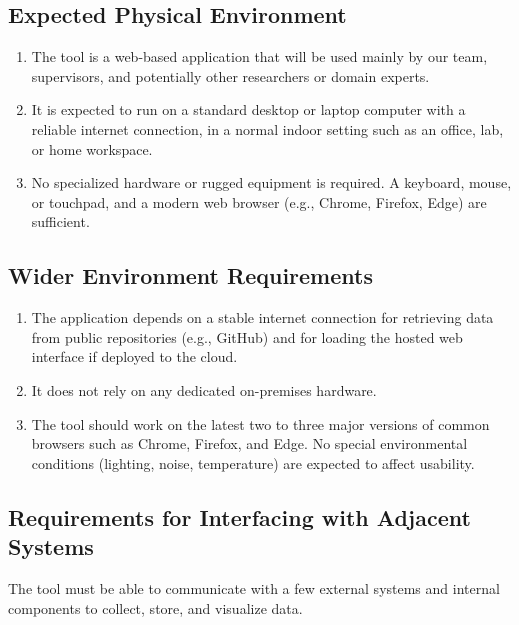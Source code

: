 \documentclass[12pt]{article}
\begin{document}
\subsection{Expected Physical Environment}

\begin{enumerate}[label=OE-EPE\arabic*]
\item The tool is a web-based application that will be used mainly by our team, supervisors, and potentially other researchers or domain experts.
\item It is expected to run on a standard desktop or laptop computer with a reliable internet connection, in a normal indoor setting such as an office, lab, or home workspace.
\item No specialized hardware or rugged equipment is required. A keyboard, mouse, or touchpad, and a modern web browser (e.g., Chrome, Firefox, Edge) are sufficient.
\end{enumerate}

\subsection{Wider Environment Requirements}
\begin{enumerate}[label=OE-WE\arabic*]
\item The application depends on a stable internet connection for retrieving data from public repositories (e.g., GitHub) and for loading the hosted web interface if deployed to the cloud.
\item It does not rely on any dedicated on-premises hardware.
\item The tool should work on the latest two to three major versions of common browsers such as Chrome, Firefox, and Edge. No special environmental conditions (lighting, noise, temperature) are expected to affect usability.
\end{enumerate}
\subsection{Requirements for Interfacing with Adjacent Systems}
The tool must be able to communicate with a few external systems and internal components to collect, store, and visualize data.
\end{document}
